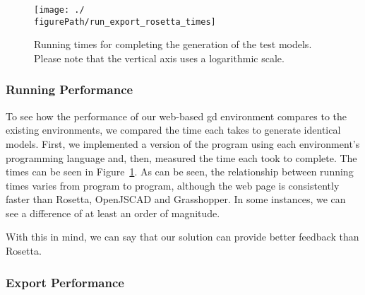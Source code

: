 \begin{figure}
  \centering
  \texttt{[image: ./\\figurePath/run\_export\_rosetta\_times]}
  \caption[Running times for completing the generation of the test models.]{Running times for completing the generation of the test models. Please note that the vertical axis uses a logarithmic scale.}
  \label{fig:run:export:rosetta:chart}
\end{figure}


\subsubsection{Running Performance}

To see how the performance of our web-based \gls{gd} environment compares to the existing environments, we compared the time each takes to generate identical models.
First, we implemented a version of the program using each environment's programming language and, then, measured the time each took to complete.
The times can be seen in Figure~\ref{fig:run:export:rosetta:chart}.
As can be seen, the relationship between running times varies from program to program, although the web page is consistently faster than Rosetta, OpenJSCAD and Grasshopper.
In some instances, we can see a difference of at least an order of magnitude.

With this in mind, we can say that our solution can provide better feedback than Rosetta.




\subsubsection{Export Performance}

